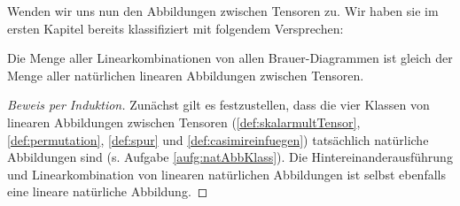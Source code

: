 Wenden wir uns nun den Abbildungen zwischen Tensoren zu. Wir haben sie im ersten Kapitel bereits klassifiziert mit folgendem Versprechen:
\begin{theorem}
	\label{brauer:klassifikation}
	Die Menge aller Linearkombinationen von allen Brauer-Diagrammen ist gleich der Menge aller natürlichen linearen Abbildungen zwischen Tensoren.
\end{theorem}
\begin{proof}[Beweis per Induktion]
Zunächst gilt es festzustellen, dass die vier Klassen von linearen Abbildungen zwischen Tensoren (\ref{def:skalarmultTensor}, \ref{def:permutation}, \ref{def:spur} und \ref{def:casimireinfuegen}) tatsächlich natürliche Abbildungen sind (s. Aufgabe \ref{aufg:natAbbKlass}).
Die Hintereinanderausführung und Linearkombination von linearen natürlichen Abbildungen ist selbst ebenfalls eine lineare natürliche Abbildung. 
 

\end{proof}
